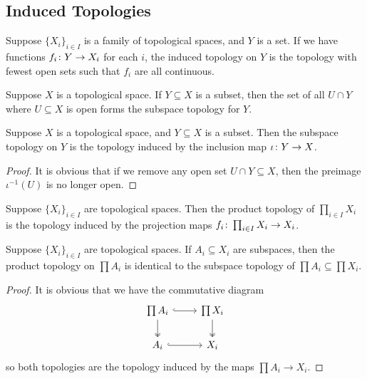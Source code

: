 \subsection*{Induced Topologies}

\begin{definition}
    Suppose \({\{X_i\}}_{i \in I}\) is a family of topological spaces, and \(Y\) is a set.
    If we have functions \(f_i\colon Y\to X_i\) for each \(i\),
    the induced topology on \(Y\) is the topology with fewest open sets
    such that \(f_i\) are all continuous.
\end{definition}

\begin{definition}
    Suppose \(X\) is a topological space.
    If \(Y \subseteq X\) is a subset, then the set of all \(U \cap Y\) where \(U \subseteq X\) is open
    forms the subspace topology for \(Y\).
\end{definition}
\begin{proposition}
    Suppose \(X\) is a topological space, and \(Y \subseteq X\) is a subset.
    Then the subspace topology on \(Y\) is the topology induced by the inclusion map \(\iota\colon Y\to X\).
\end{proposition}
\begin{proof}
    It is obvious that if we remove any open set \(U \cap Y \subseteq X\),
    then the preimage \(\iota^{-1}(U)\) is no longer open.
\end{proof}

\begin{definition}
    Suppose \({\{X_i\}}_{i \in I}\) are topological spaces.
    Then the product topology of \(\prod_{i \in I} X_i\)
    is the topology induced by the projection maps \(f_i\colon\prod_{i \in I} X_i\to X_i\).
\end{definition}

\begin{theorem}
    Suppose \({\{X_i\}}_{i \in I}\) are topological spaces.
    If \(A_i \subseteq X_i\) are subspaces,
    then the product topology on \(\prod A_i\) is identical to the subspace topology of \(\prod A_i \subseteq \prod X_i\).
\end{theorem}
\begin{proof}
    It is obvious that we have the commutative diagram
    \begin{equation*}
        \begin{tikzcd}
            \prod A_i \arrow[hookrightarrow]{r} \arrow[twoheadrightarrow]{d} & \prod X_i \arrow[twoheadrightarrow]{d} \\
            A_i \arrow[hookrightarrow]{r} & X_i
        \end{tikzcd}
    \end{equation*}
    so both topologies are the topology induced by the maps \(\prod A_i \to X_i\).
\end{proof}

